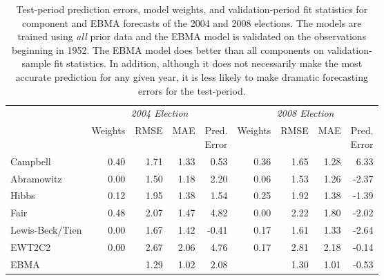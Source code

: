 \documentclass[12pt,fullpage,endnotes]{article}
\begin{document}
\begin{table}[p]
  \caption{\footnotesize Test-period prediction errors, model weights, and validation-period fit 
    statistics for component and EBMA forecasts  of the 2004 and 2008  
    elections. The models are trained using \textit{all} prior data and the 
    EBMA model is validated on the observations beginning in 1952.  
    The EBMA model does better than all components on 
    validation-sample fit statistics.  In addition, although it does not 
    necessarily make the most accurate prediction for any given year,
    it is less likely to make  dramatic forecasting errors for the test-period.}
\label{Pres-Year-Res} \small
\begin{center}
\begin{tabular}{l rrrrrrrr}	
  \toprule
   &\multicolumn{4}{c}{\textit{2004 Election}} &\multicolumn{4}{c}{\textit{2008 Election}} \\ 
 &	Weights&	RMSE &MAE &\shortstack{Pred. \\ Error}
 &Weights&	RMSE&	MAE &  \shortstack{Pred.\\  Error}\\
\midrule
 Campbell               & 0.40 & 1.71 & 1.33 & 0.53 & 0.36 & 1.65 & 1.28 & 6.33\\
  Abramowitz        	& 0.00 & 1.50 & 1.18 & 2.20 & 0.06 & 1.53 & 1.26 & -2.37\\
  Hibbs                   	& 0.12 & 1.95 & 1.38 & 1.54 & 0.25 & 1.92 & 1.38 & -1.39\\
  Fair                      	& 0.48 & 2.07 & 1.47 & 4.82  & 0.00 & 2.22 & 1.80 & -2.02 \\
  Lewis-Beck/Tien 	& 0.00 & 1.67 & 1.42 & -0.41& 0.17 & 1.61 & 1.33 & -2.64\\
  EWT2C2 		& 0.00 & 2.67 & 2.06 & 4.76  & 0.17 & 2.81 & 2.18 & -0.14\\
   EBMA                    	&  & 1.29 & 1.02 & 2.08 &  & 1.30 & 1.01 & -0.53\\
\bottomrule
\end{tabular}
 \end{center}
 \end{table}
\end{document}
